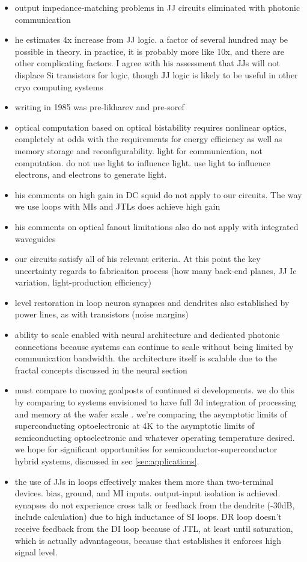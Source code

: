 \documentclass[twocolumn]{article}
\begin{document}
\begin{itemize}
\item output impedance-matching problems in JJ circuits eliminated with photonic communication
\item he estimates 4x increase from JJ logic. a factor of several hundred may be possible in theory. in practice, it is probably more like 10x, and there are other complicating factors. I agree with his assessment that JJs will not displace Si transistors for logic, though JJ logic is likely to be useful in other cryo computing systems
\item writing in 1985 was pre-likharev and pre-soref
\item optical computation based on optical bistability requires nonlinear optics, completely at odds with the requirements for energy efficiency as well as memory storage and reconfigurability. light for communication, not computation. do not use light to influence light. use light to influence electrons, and electrons to generate light.
\item his comments on high gain in DC squid do not apply to our circuits. The way we use loops with MIs and JTLs does achieve high gain
\item his comments on optical fanout limitations also do not apply with integrated waveguides
\item our circuits satisfy all of his relevant criteria. At this point the key uncertainty regards to fabricaiton process (how many back-end planes, JJ Ic variation, light-production efficiency)
\item level restoration in loop neuron synapses and dendrites also established by power lines, as with transistors (noise margins)
\item ability to scale enabled with neural architecture and dedicated photonic connections because systems can continue to scale without being limited by communication bandwidth. the architecture itself is scalable due to the fractal concepts discussed in the neural section
\item must compare to moving goalposts of continued si developments. we do this by comparing to systems envisioned to have full 3d integration of processing and memory at the wafer scale \cite{kuwa2017}. we're comparing the asymptotic limits of superconducting optoelectronic at 4K to the asymptotic limits of semiconducting optoelectronic and whatever operating temperature desired. we hope for significant opportunities for semiconductor-superconductor hybrid systems, discussed in sec \ref{sec:applications}.
\item the use of JJs in loops effectively makes them more than two-terminal devices. bias, ground, and MI inputs. output-input isolation is achieved. synapses do not experience cross talk or feedback from the dendrite (-30dB, include calculation) due to high inductance of SI loops. DR loop doesn't receive feedback from the DI loop because of JTL, at least until saturation, which is actually advantageous, because that establishes it enforces high signal level.

\end{itemize}
\end{document}
